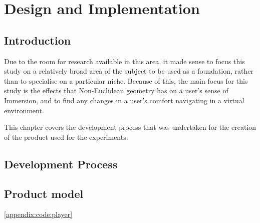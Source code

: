 \chapter[Product]{Design and Implementation}
\label{design}

	\section{Introduction}

		Due to the room for research available in this area, it made sense to focus this study on a relatively broad area of the subject to be used as a foundation, rather than to specialise on a particular niche.
		Because of this, the main focus for this study is the effects that Non-Euclidean geometry has on a user's sense of Immersion, and to find any changes in a user's comfort navigating in a virtual environment.

		This chapter covers the development process that was undertaken for the creation of the product used for the experiments.

	\section{Development Process}





	\section{Product model}
		\autoref{appendix:code:player}

